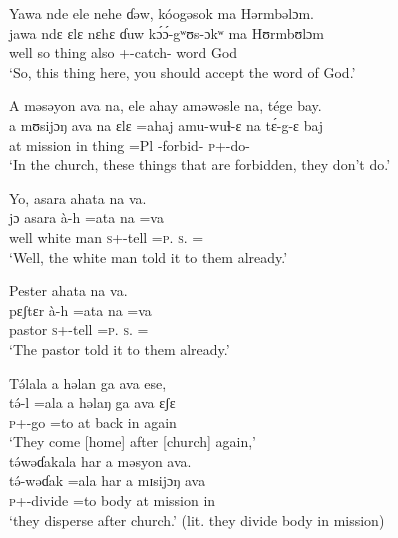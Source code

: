 \ea Yawa  nde  ele  nehe  ɗəw,  kóogəsok ma  Hərmbəlɔm.  \\
 \gll jawa  ndɛ  ɛlɛ   nɛhɛ   ɗuw k\'ɔ\'ɔ-gʷʊs-ɔkʷ ma   Hʊrmbʊlɔm\\
 well    so  thing  {\DEM}  also  {\twoS}+{\POT}-catch-{\twoP}    word  God\\
 \glt ‘So, this thing here, you should accept the word of God.’ 
 \z

\ea A  məsəyon  ava  na,  ele  ahay  aməwəsle  na,  tége  bay.\\
 \gll a  mʊsijɔŋ    ava   na  ɛlɛ   =ahaj  amu-wuɬ-ɛ     na   t\'ɛ-g-ɛ     baj\\
 at  mission    in  {\PSP}  thing  =Pl        {\DEP}-forbid-{\CL}   {\PSP}  \textsc{p}+{\IFV}-do-{\CL}  {\NEG}\\
 \glt ‘In the church, these things that are forbidden, they don’t do.’
 \z

\ea Yo, asara  ahata  na  va.    \\
 \gll jɔ     asara     à-h    =ata  na   =va \\
 well {white man}  \textsc{s}+{\PFV}-tell  =\textsc{p}.{\IO}  \textsc{s}.{\DO}  ={\PRF}\\
 \glt ‘Well, the white man told it to them already.’ 
 \z

\ea Pester  ahata  na  va.  \\
 \gll pɛʃtɛr   à-h    =ata   na   =va\\
 pastor  \textsc{s}+{\PFV}-tell  =\textsc{p}.{\IO}  \textsc{s}.{\DO}  ={\PRF}\\
 \glt ‘The pastor told it to them already.’ 
 \z

\ea T\'əlala a  həlan  ga  ava  ese,   \\
 \gll t\'ə-l    =ala   a   həlaŋ  ga   ava   ɛʃɛ   \\
 \textsc{p}+{\IFV}-go  =to  at  back  {\ADJ}  in  again  \\
 \glt ‘They come [home] after [church] again,’\\
 
 \medskip
  t\'əwəɗakala  har  a  məsyon  ava.\\
 \gll t\'ə-wəɗak    =ala   har   a   mɪsijɔŋ   ava\\
 \textsc{p}+{\IFV}-divide  =to  body  at  mission  in\\
 \glt ‘they disperse after church.’ (lit. they divide body in mission)
 \z

